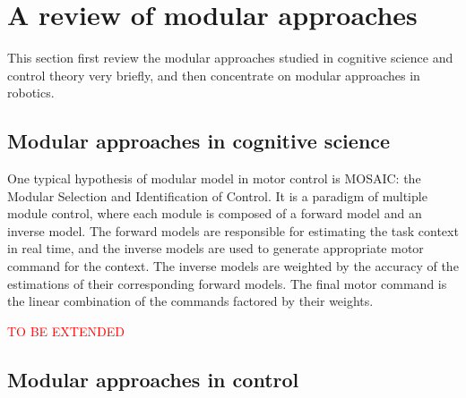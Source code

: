 \section{A review of modular approaches}
\label{cha2:sec3}
This section first review the modular approaches studied in cognitive science and control theory very briefly, and then concentrate on modular approaches in robotics.

\subsection{Modular approaches in cognitive science}
\label{cha2:sec3:cognitive}

One typical hypothesis of modular model in motor control is MOSAIC: the Modular Selection and Identification of Control. It is a paradigm of multiple module control, where each module is composed of a forward model and an inverse model. The forward models are responsible for estimating the task context in real time, and the inverse models are used to generate appropriate motor command for the context. The inverse models are weighted by the accuracy of the estimations of their corresponding forward models. The final motor command is the linear combination of the commands factored by their weights.

\textcolor{red}{TO BE EXTENDED}

\subsection{Modular approaches in control}
\label{cha2:sec3:control}

